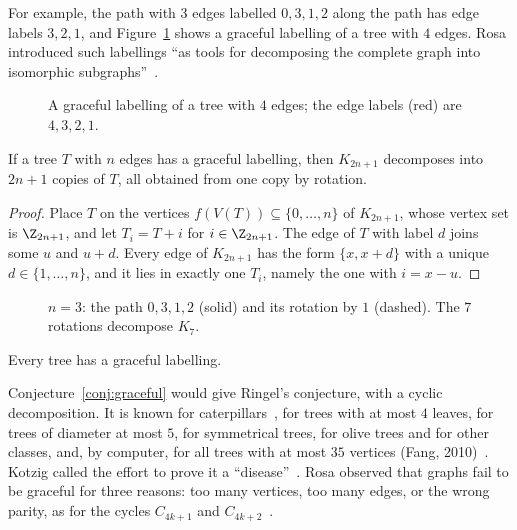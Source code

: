 For example, the path with $3$ edges labelled $0,3,1,2$ along the path has edge labels $3,2,1$, and Figure~\ref{fig:fork} shows a graceful labelling of a tree with $4$ edges. Rosa introduced such labellings ``as tools for decomposing the complete graph into isomorphic subgraphs''~\cite[\S1]{gal25}.

\begin{figure}[ht]
\centering

\caption{A graceful labelling of a tree with $4$ edges; the edge labels (red) are $4,3,2,1$.}
\label{fig:fork}
\end{figure}

\begin{theorem}\label{thm:rosa}
If a tree $T$ with $n$ edges has a graceful labelling, then $K_{2n+1}$ decomposes into $2n+1$ copies of $T$, all obtained from one copy by rotation.
\end{theorem}

\begin{proof}
Place $T$ on the vertices $f(V(T))\subseteq\{0,\dots,n\}$ of $K_{2n+1}$, whose vertex set is $\Z_{2n+1}$, and let $T_i=T+i$ for $i\in\Z_{2n+1}$. The edge of $T$ with label $d$ joins some $u$ and $u+d$. Every edge of $K_{2n+1}$ has the form $\{x,x+d\}$ with a unique $d\in\{1,\dots,n\}$, and it lies in exactly one $T_i$, namely the one with $i=x-u$.
\end{proof}

\begin{figure}[ht]
\centering

\caption{$n=3$: the path $0,3,1,2$ (solid) and its rotation by $1$ (dashed). The $7$ rotations decompose $K_7$.}
\label{fig:rosa-k7}
\end{figure}

\begin{conjecture}\label{conj:graceful}
Every tree has a graceful labelling.
\end{conjecture}

Conjecture~\ref{conj:graceful} would give Ringel's conjecture, with a cyclic decomposition. It is known for caterpillars~\cite{ros67}, for trees with at most $4$ leaves, for trees of diameter at most $5$, for symmetrical trees, for olive trees and for other classes, and, by computer, for all trees with at most $35$ vertices (Fang, 2010)~\cite[\S2.1]{gal25}. Kotzig called the effort to prove it a ``disease''~\cite[\S2.1]{gal25}. Rosa observed that graphs fail to be graceful for three reasons: too many vertices, too many edges, or the wrong parity, as for the cycles $C_{4k+1}$ and $C_{4k+2}$~\cite[\S1]{gal25}.

